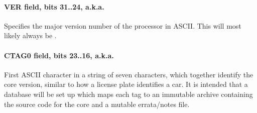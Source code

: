 \paragraph*{VER field, bits 31..24, a.k.a. }
\label{reg:CVER}
Specifies the major version number of the \rvex{} processor in ASCII. This will
most likely always be .
\paragraph*{CTAG0 field, bits 23..16, a.k.a. }
\label{reg:CTAG}
First ASCII character in a string of seven characters, which together identify
the core version, similar to how a license plate identifies a car. It is
intended that a database will be set up which maps each tag to an immutable
archive containing the source code for the core and a mutable errata/notes file.
